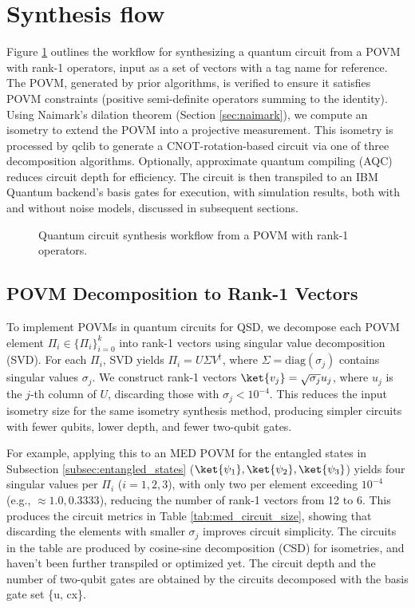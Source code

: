 \section{Synthesis flow}
\label{sec:qc_workflow}
Figure \ref{fig:qc_workflow} outlines the workflow for synthesizing a quantum
circuit from a POVM with rank-1 operators, input as a set of vectors with a tag name for reference.
The POVM, generated by prior algorithms, is verified to ensure it satisfies
POVM constraints (positive semi-definite operators summing to the identity).
Using Naimark’s dilation theorem (Section \ref{sec:naimark}), we compute an
isometry to extend the POVM into a projective measurement.
This isometry is processed by qclib \cite{qclib} to generate a CNOT-rotation-based
circuit via one of three decomposition algorithms.
Optionally, approximate quantum compiling (AQC) reduces circuit depth for efficiency.
The circuit is then transpiled to an IBM Quantum backend’s basis gates for
execution, with simulation results, both with and without noise models,
discussed in subsequent sections.

\begin{figure}[htbp]
    \centering
    \scalebox{0.7}{
        
    }
    \caption{Quantum circuit synthesis workflow from a POVM with rank-1 operators.}
    \label{fig:qc_workflow}
\end{figure}

\subsection{POVM Decomposition to Rank-1 Vectors}
To implement POVMs in quantum circuits for QSD, we decompose each POVM element
\(\Pi_i \in \{ \Pi_i \}_{i=0}^k\) into rank-1 vectors using singular value
decomposition (SVD).
For each \(\Pi_i\), SVD yields \(\Pi_i = U \Sigma V^\dagger\), where
\(\Sigma = \text{diag}(\sigma_j)\) contains singular values \(\sigma_j\).
We construct rank-1 vectors \(\ket{v_j} = \sqrt{\sigma_j} u_j\), where
\( u_j \) is the \( j \)-th column of \( U \), discarding those with
\(\sigma_j < 10^{-4}\).
This reduces the input isometry size for the same isometry synthesis method,
producing simpler circuits with fewer qubits, lower depth, and fewer two-qubit gates.

For example, applying this to an MED POVM for the entangled states in Subsection
\ref{subsec:entangled_states} (\(\ket{\psi_1}, \ket{\psi_2}, \ket{\psi_3}\))
yields four singular values per \(\Pi_i\) (\(i=1,2,3\)), with only two per
element exceeding \(10^{-4}\) (e.g., \(\approx 1.0, 0.3333\)), reducing the
number of rank-1 vectors from 12 to 6.
This produces the circuit metrics in Table \ref{tab:med_circuit_size}, showing that
discarding the elements with smaller \(\sigma_j\) improves circuit simplicity.
The circuits in the table are produced by cosine-sine decomposition (CSD)
for isometries, and haven't been further transpiled or optimized yet.
The circuit depth and the number of two-qubit gates are obtained by the
circuits decomposed with the basis gate set \{u, cx\}.

